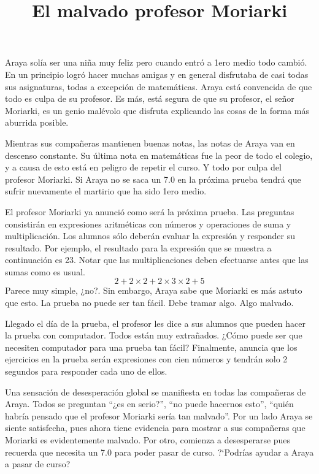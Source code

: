 \documentclass{oci}
\title{El malvado profesor Moriarki}
\begin{document}
\begin{problemDescription}
Araya solía ser una niña muy feliz pero cuando entró a 1ero medio todo cambió.
En un principio logró hacer muchas amigas y en general disfrutaba de casi todas
sus asignaturas, todas a excepción de matemáticas.
Araya está convencida de que todo es culpa de su profesor.
Es más, está segura de que su profesor, el señor Moriarki, es un genio malévolo
que disfruta explicando las cosas de la forma más aburrida posible.

Mientras sus compañeras mantienen buenas notas, las notas de Araya van en
descenso constante.
Su última nota en matemáticas fue la peor de todo el colegio, y a causa de esto
está en peligro de repetir el curso.
Y todo por culpa del profesor Moriarki.
Si Araya no se saca un 7.0 en la próxima prueba tendrá que sufrir nuevamente el
martirio que ha sido 1ero medio.

El profesor Moriarki ya anunció como será la próxima prueba.
Las preguntas consistirán en expresiones aritméticas con números y operaciones
de suma y multiplicación.
Los alumnos sólo deberán evaluar la expresión y responder su resultado.
Por ejemplo, el resultado para la expresión que se muestra a continuación es 23.
Notar que las multiplicaciones deben efectuarse antes que las sumas como es usual.
$$
2 + 2 \times 2 + 2\times 3 \times 2 + 5
$$
Parece muy simple, ¿no?.
Sin embargo, Araya sabe que Moriarki es más astuto que 	esto.
La prueba no puede ser tan fácil.
Debe tramar algo.
Algo malvado.

Llegado el día de la prueba, el profesor les dice a sus alumnos que pueden hacer
la prueba con computador.
Todos están muy extrañados.
¿Cómo puede ser que necesiten computador para una prueba tan fácil?
Finalmente, anuncia que los ejercicios en la prueba serán expresiones con cien
números y tendrán solo 2 segundos para responder cada uno de ellos.

Una sensación de desesperación global se manifiesta en todas las compañeras de
Araya.
Todos se preguntan ``¿es en serio?'', ``no puede hacernos esto'', ``quién
habría pensado que el profesor Moriarki sería tan malvado''.
Por un lado Araya se siente satisfecha, pues ahora tiene evidencia para mostrar a sus
compañeras que Moriarki es evidentemente malvado.
Por otro, comienza a desesperarse pues recuerda que necesita un 7.0 para poder
pasar de curso.
?`Podrías ayudar a Araya a pasar de curso?


\end{problemDescription}
\end{document}
